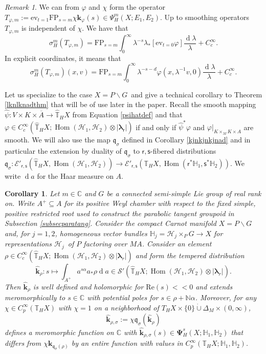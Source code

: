 \documentclass[a4paper,reqno]{amsart}
\numberwithin{equation}{section}
\def\Hom{\operatorname{Hom}}
\def\rd{\operatorname{d}\!}
\def\C{\mathbb{C}}
\def\N{\mathbb{N}}
\def\T{\mathbb{T}}
\newtheorem{cor}[thm]{Corollary}
\theoremstyle{definition}
\theoremstyle{remark}
\newtheorem{remark}[thm]{Remark}
\begin{document}
\begin{remark}
\label{ljknkjlnad}
We can from $\varphi$ and $\chi$ form the operator $T_{\varphi,m}:=\mathrm{ev}_{t=1}\mathrm{FP}_{s=m}\chi\pmb{k}_{\varphi}(s)\in \Psi^m_H(X;E_1,E_2)$. Up to smoothing operators $T_{\varphi,m}$ is independent of $\chi$. We have that 
$$\sigma_H^m(T_{\varphi,m})=\mathrm{FP}_{s=m}\int_0^\infty \lambda^{-s}\lambda_*[\mathrm{ev}_{t=0}\varphi] \frac{\rd \lambda}{\lambda}+C^\infty_c.$$
In explicit coordinates, it means that 
$$\sigma_H^m(T_{\varphi,m})(x,v)=\mathrm{FP}_{s=m}\int_0^\infty \lambda^{-s-d}\varphi(x,\lambda ^{-1}v,0) \frac{\rd \lambda}{\lambda}+C^\infty_c.$$
\end{remark}

Let us specialize to the case $X=P\backslash G$ and give a technical corollary to Theorem \ref{lknlknadthm} that will be of use later in the paper. Recall the smooth mapping $\hat{\psi}:V\times K\times \overline{A}\to \widehat{\T}_HX$ from Equation \eqref{psihatdef} and that $\varphi\in C^\infty_c(\widehat{\T}_HX; \Hom(\mathcal{H}_1,\mathcal{H}_2)\otimes |\pmb{\lambda}_\mathsf{r}|)$ if and only if $\hat{\psi}^*\varphi$ and $\varphi|_{K\times_M K\times A}$ are smooth. We will also use the map $\mathfrak{q}_\sigma$ defined in Corollary \ref{kjnkjnkjnad} and in particular the extension by duality of $\mathfrak{q}_\sigma$ to $\mathsf{r},\mathsf{s}$-fibered distributions $\mathfrak{q}_\sigma:\mathcal{E}'_{\mathsf{r},\mathsf{s}}(\widehat{\mathbb{T}}_HX,\Hom(\mathcal{H}_1,\mathcal{H}_2))\to \mathcal{E}'_{\mathsf{r},\mathsf{s}}(\mathbb{T}_HX,\Hom(\mathsf{r}^*\mathbb{H}_1,\mathsf{s}^*\mathbb{H}_2))$. We write $\rd a$ for the Haar measure on $A$.

\begin{cor}
\label{lknlknad}
Let $m\in \C$ and $G$ be a connected semi-simple Lie group of real rank on. Write $A^+\subseteq A$ for its positive Weyl chamber with respect to the fixed simple, positive restricted root used to construct the parabolic tangent groupoid in Subsection \ref{subsecparatang}. Consider the compact Carnot manifold $X=P\backslash G$ and, for $j=1,2$, homogeneous vector bundles $\mathbb{H}_j=\mathcal{H}_j\times_P G\to X$ for representations $\mathcal{H}_j$ of $P$ factoring over $MA$. Consider an element $\rho\in C^\infty_c(\widehat{\mathbb{T}}_HX; \Hom(\mathcal{H}_1,\mathcal{H}_2)\otimes |\pmb{\lambda}_r|)$ and form the tempered distribution
$$
\hat{\pmb{k}}_{\rho}:s\mapsto \int_{A^+} a^{s\alpha }a_*\rho \rd a\in \mathcal{S}'(\widehat{\mathbb{T}}_HX; \Hom(\mathcal{H}_1,\mathcal{H}_2)\otimes |\pmb{\lambda}_r|).
$$
Then $\hat{\pmb{k}}_{\rho}$ is well defined and holomorphic for $\mathrm{Re}(s)<<0$ and extends meromorphically to $s\in \C$ with potential poles for $s\in \rho+\N\alpha$. Moreover, for any $\chi\in C^\infty_p(\T_HX)$ with $\chi=1$ on a neighborhood of $T_HX\times \{0\}\dot{\cup}\Delta_M\times (0,\infty)$,
$$\hat{\pmb{k}}_{\rho,\sigma}:=\chi \mathfrak{q}_\sigma(\hat{\pmb{k}}_{\rho})$$
defines a meromorphic function on $\C$ with $\hat{\pmb{k}}_{\rho,\sigma}(s)\in \pmb{\Psi}^s_H(X;\mathbb{H}_1,\mathbb{H}_2)$ that differs from $\chi \pmb{k}_{\mathfrak{q}_\sigma(\rho)}$ by an entire function with values in $C^\infty_p(\T_H X;\mathbb{H}_1,\mathbb{H}_2)$. 
\end{cor}
\end{document}
